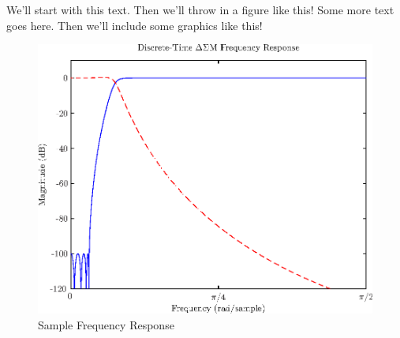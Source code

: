 \documentclass[11pt,letterpaper]{report}
\numberwithin{equation}{chapter}
\begin{document}
\pagestyle{empty}
We'll start with this text. Then we'll throw in a figure like this!
%  
Some more text goes here. Then we'll include some graphics like this!
\begin{figure}[htbp]
 \includegraphics{sample_fig_final.eps} 
 \caption{Sample Frequency Response}
 \label{fig:sample_figure}
\end{figure}
\end{document}
